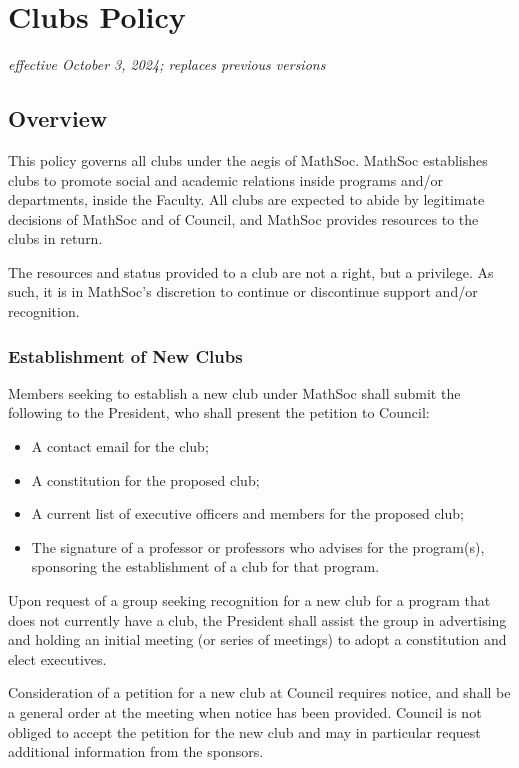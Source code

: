 \section{Clubs Policy}
\emph{effective October 3, 2024; replaces previous versions}
\subsection{Overview}
This policy governs all clubs under the aegis of MathSoc. MathSoc establishes
clubs to promote social and academic relations inside programs and/or
departments, inside the Faculty. All clubs are expected to abide by legitimate
decisions of MathSoc and of Council, and MathSoc provides resources to the clubs
in return.

The resources and status provided to a club are not a right, but a privilege.
As such, it is in MathSoc's discretion to continue or discontinue support and/or
recognition.

\subsubsection{Establishment of New Clubs}
Members seeking to establish a new club under MathSoc shall submit the following
to the President, who shall present the petition to Council:

\begin{itemize}
  \item A contact email for the club;
  \item A constitution for the proposed club;
  \item A current list of executive officers and members for the proposed club;
  \item The signature of a professor or professors who advises for the
	  program(s), sponsoring the establishment of a club for that program.
\end{itemize}

Upon request of a group seeking recognition for a new club for a program that
does not currently have a club, the President shall assist the
group in advertising and holding an initial meeting (or series of meetings) to
adopt a constitution and elect executives.

Consideration of a petition for a new club at Council requires notice, and shall
be a general order at the meeting when notice has been provided. Council is not
obliged to accept the petition for the new club and may in particular request
additional information from the sponsors.

